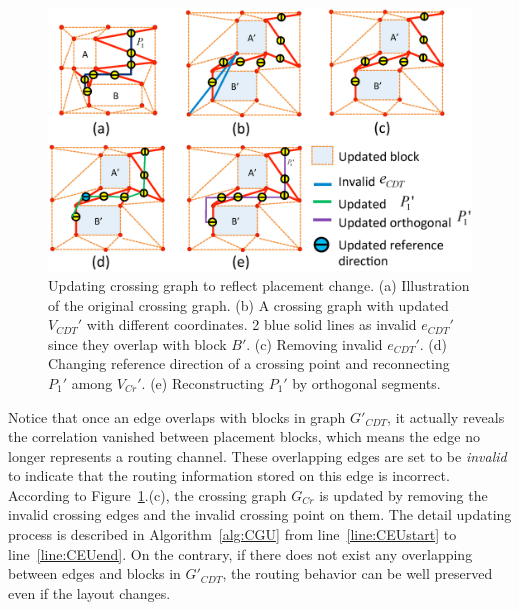     \begin{figure}[ht]
      \begin{center}
      \includegraphics[width=\textwidth]{Fig/UCG.eps}
      \caption{
        Updating crossing graph to reflect placement change.
        (a) Illustration of the original crossing graph.
        (b) A crossing graph with updated $V_{CDT}'$ with different coordinates. 2 blue solid lines as invalid $e_{CDT}'$ since they overlap with block $B'$.
        (c) Removing invalid $e_{CDT}'$.
        (d) Changing reference direction of a crossing point and reconnecting $P_1'$ among $V_{Cr}'$. 
        (e) Reconstructing $P_1'$ by orthogonal segments.
      }
      \label{fig:CGU}
      \end{center}
    \end{figure}


    Notice that once an edge overlaps with blocks in graph $G'_{CDT}$, it actually reveals the correlation vanished between placement blocks, 
    which means the edge no longer represents a routing channel.
    These overlapping edges are set to be {\it invalid} to indicate that the routing information stored on this edge is incorrect.
    According to Figure~\ref{fig:CGU}.(c), the crossing graph $G_{Cr}$ is updated by removing the invalid crossing edges and the invalid crossing point on them. The detail updating process is described in Algorithm~\ref{alg:CGU} from line~\ref{line:CEUstart} to line~\ref{line:CEUend}.
    On the contrary, if there does not exist any overlapping between edges and blocks in $G'_{CDT}$, the routing behavior can be well preserved even if the layout changes.

      

